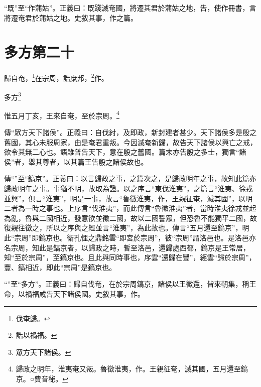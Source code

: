 {\noindent\shu{}\fzkt “既”至“作蒲姑”。正義曰：既踐滅奄國，將遷其君於蒲姑之地，告，使作冊書，言將遷奄君於蒲姑之地。史敘其事，作之篇。 \par}

\section{多方第二十}


歸自奄，\footnote{伐奄歸。}在宗周，誥庶邦，\footnote{誥以禍福。}作。

多方\footnote{眾方天下諸侯。}

惟五月丁亥，王來自奄，至於宗周。\footnote{歸政之明年，淮夷奄又叛。魯徵淮夷，作。王親征奄，滅其國，五月還至鎬京。○費音秘。}

{\noindent\zhuan{}\fzbyks 傳“眾方天下諸侯”。正義曰：自伐紂，及即政，新封建者甚少。天下諸侯多是殷之舊國，其心未服周家，由是奄君重叛。今因滅奄新歸，故告天下諸侯以興亡之戒，欲令其無二心也。語雖普告天下，意在殷之舊國。篇末亦告殷之多士，獨言“諸侯”者，舉其尊者，以其篇王告殷之諸侯故也。 \par}

{\noindent\zhuan{}\fzbyks 傳“”至“鎬京”。正義曰：以言歸政之事，之篇次之，是歸政明年之事，故知此篇亦歸政明年之事。事猶不明，故取為證。以之序言“東伐淮夷”，之篇言“淮夷、徐戎並興”，俱言“淮夷”，明是一事，故言“魯徵淮夷，作，王親征奄，滅其國”，以明二者為一時之事也。上序言“伐淮夷”，而此傳言“魯徵淮夷”者，當時淮夷徐戎並起為亂，魯與二國相近，發意欲並徵二國，故以二國誓眾，但恐魯不能獨平二國，故復親往徵之，所以之序與之經並言“淮夷”，為此故也。傳言“五月還至鎬京”，明此“宗周”即鎬京也。衛孔悝之鼎銘雲“即宮於宗周”，彼“宗周”謂洛邑也。是洛邑亦名宗周，知此是鎬京者，以歸政之時，暫至洛邑，還歸處西都，鎬京是王常居，知“至於宗周”，至鎬京也。且此與同時事也，序雲“還歸在豐”，經雲“歸於宗周”，豐、鎬相近，即此“宗周”是鎬京也。 \par}

{\noindent\shu{}\fzkt “”至“多方”。正義曰：歸自伐奄，在於宗周鎬京，諸侯以王徵還，皆來朝集，稱王命，以禍福咸告天下諸侯國。史敘其事，作。 \par}

